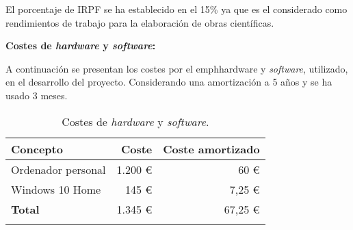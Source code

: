 El porcentaje de IRPF\cite{IRPF} se ha establecido en el 15\% ya que es el considerado como rendimientos de trabajo para la elaboración de obras científicas.

\textbf{Costes de \emph{hardware} y \emph{software}:}

A continuación se presentan los costes por el emph{hardware} y \emph{software}, utilizado, en el desarrollo del proyecto. Considerando una amortización a 5 años y se ha usado 3 meses.

\begin{longtable}[]{@{}lrr@{}}
\toprule
\begin{minipage}[b]{0.4\columnwidth}\raggedright\strut
\textbf{Concepto}\strut
\end{minipage} & \begin{minipage}[b]{0.18\columnwidth}\raggedright\strut
\textbf{Coste}\strut
\end{minipage} & \begin{minipage}[b]{0.32\columnwidth}\raggedright\strut
\textbf{Coste amortizado}\strut
\end{minipage}\tabularnewline
\midrule
\endhead
\begin{minipage}[t]{0.4\columnwidth}\raggedright\strut
Ordenador personal\strut
\end{minipage} & \begin{minipage}[t]{0.18\columnwidth}\raggedright\strut
1.200 \euro{}\strut
\end{minipage} & \begin{minipage}[t]{0.32\columnwidth}\raggedright\strut
60 \euro{}\strut
\end{minipage}\tabularnewline
\begin{minipage}[t]{0.4\columnwidth}\raggedright\strut
Windows 10 Home\strut
\end{minipage} & \begin{minipage}[t]{0.18\columnwidth}\raggedright\strut
145 \euro{}\strut
\end{minipage} & \begin{minipage}[t]{0.32\columnwidth}\raggedright\strut
7,25 \euro{}\strut
\end{minipage}\tabularnewline
\midrule
\begin{minipage}[t]{0.4\columnwidth}\raggedright\strut
\textbf{Total}\strut
\end{minipage} & \begin{minipage}[t]{0.18\columnwidth}\raggedright\strut
1.345 \euro{}\strut
\end{minipage} & \begin{minipage}[t]{0.32\columnwidth}\raggedright\strut
67,25 \euro{}\strut
\end{minipage}\tabularnewline
\bottomrule
\caption{Costes de \emph{hardware} y \emph{software}.}
\end{longtable}

